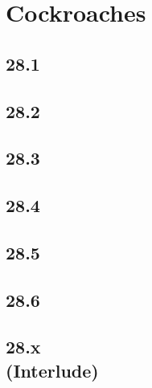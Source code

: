 \part{Cockroaches}

 \chapter{28.1}

 \chapter{28.2}

 \chapter{28.3}

 \chapter{28.4}

 \chapter{28.5}

 \chapter{28.6}

 \chapter[28.x (Interlude)]{28.x\\(Interlude)}








